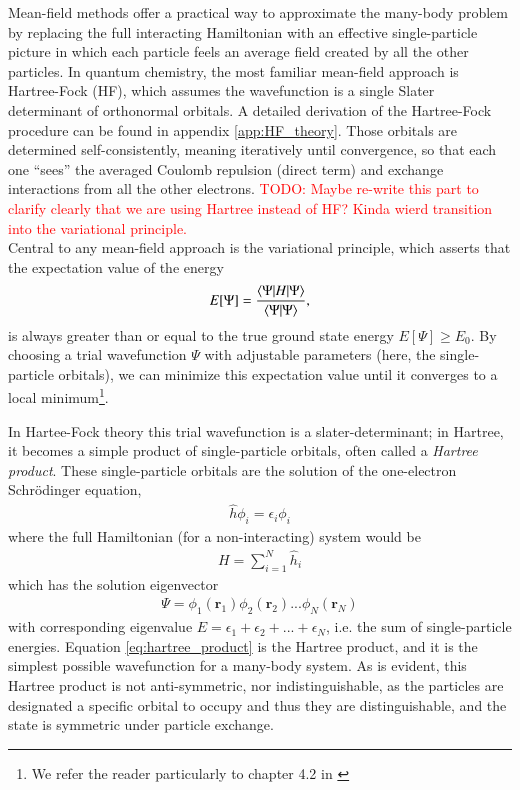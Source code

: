 \documentclass{subfiles}
\begin{document}
Mean-field methods offer a practical way to approximate the many-body problem by replacing the full interacting Hamiltonian with an effective single-particle picture in which each particle feels an average field created by all the other particles. In quantum chemistry, the most familiar mean-field approach is Hartree-Fock (HF), which assumes the wavefunction is a single Slater determinant of orthonormal orbitals. A detailed derivation of the Hartree-Fock procedure can be found in appendix \ref{app:HF_theory}. Those orbitals are determined self-consistently, meaning iteratively until convergence, so that each one “sees” the averaged Coulomb repulsion (direct term) and exchange interactions from all the other electrons. \textcolor{red}{TODO: Maybe re-write this part to clarify clearly that we are using Hartree instead of HF? Kinda wierd transition into the variational principle.}
\\
Central to any mean-field approach is the variational principle, which asserts that the expectation value of the energy
\begin{equation}
    E[\Psi] = \frac{\braket{\Psi|H|\Psi}}{\braket{\Psi|\Psi}}\label{eq:variational_principle},
\end{equation}
is always greater than or equal to the true ground state energy $E[\Psi]\geq E_0$. By choosing a trial wavefunction $\Psi$ with adjustable parameters (here, the single-particle orbitals), we can minimize this expectation value until it converges to a local minimum\cite{helgaker2013molecular}\footnote{We refer the reader particularly to chapter 4.2 in \cite{helgaker2013molecular}}. 

In Hartee-Fock theory this trial wavefunction is a slater-determinant; in Hartree, it becomes a simple product of single-particle orbitals, often called a \emph{Hartree product}. These single-particle orbitals are the solution of the one-electron Schrödinger equation, 
\begin{align*}
    \hat{h}\phi_i = \epsilon_i\phi_i
\end{align*}
where the full Hamiltonian (for a non-interacting) system would be 
\begin{align*}
    H = \sum_{i=1}^N \hat{h}_i
\end{align*}
which has the solution eigenvector
\begin{align}
    \Psi = \phi_1(\mathbf{r}_1)\phi_2(\mathbf{r}_2)...\phi_N(\mathbf{r}_N)\label{eq:hartree_product}
\end{align}
with corresponding eigenvalue $E = \epsilon_1 + \epsilon_2 + ... + \epsilon_N$, i.e. the sum of single-particle energies. Equation \eqref{eq:hartree_product} is the Hartree product, and it is the simplest possible wavefunction for a many-body system. As is evident, this Hartree product is not anti-symmetric, nor indistinguishable, as the particles are designated a specific orbital to occupy and thus they are distinguishable, and the state is symmetric under particle exchange.
\end{document}
